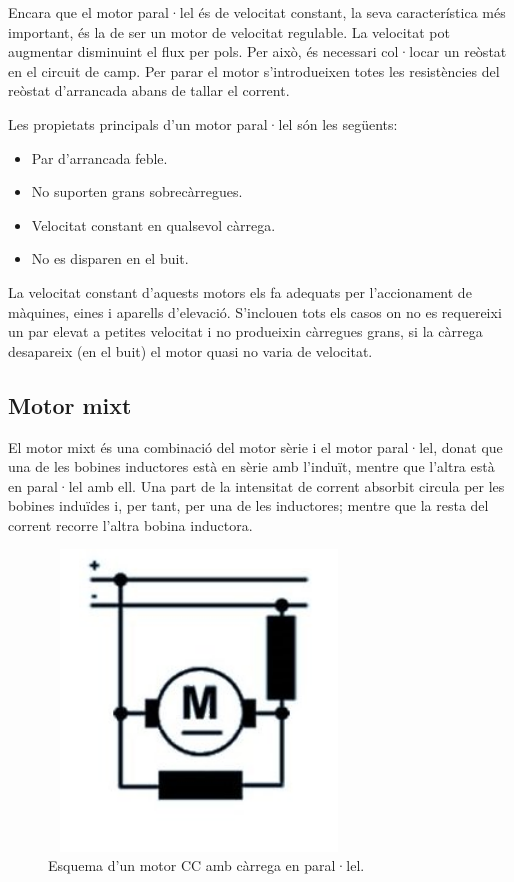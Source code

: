 Encara que el motor paral·lel és de velocitat constant, la seva característica més important, és la de ser un motor de velocitat regulable. La velocitat pot augmentar disminuint el flux per pols. Per això, és necessari col·locar un reòstat en el circuit de camp. Per parar el motor s'introdueixen totes les resistències del reòstat d'arrancada abans de tallar el corrent.

Les propietats principals d'un motor paral·lel són les següents:
\begin{itemize}
    \item Par d'arrancada feble.
    \item No suporten grans sobrecàrregues.
    \item Velocitat constant en qualsevol càrrega.
    \item No es disparen en el buit.
\end{itemize}

La velocitat constant d'aquests motors els fa adequats per l'accionament de màquines, eines i aparells d'elevació. S'inclouen tots els casos on no es requereixi un par elevat a petites velocitat i no produeixin càrregues grans, si la càrrega desapareix (en el buit) el motor quasi no varia de velocitat.

\subsection{Motor mixt}
El motor mixt és una combinació del motor sèrie i el motor paral·lel,  donat que una de les bobines inductores està en sèrie amb l'induït, mentre que l'altra està en paral·lel amb ell. Una part de la intensitat de corrent absorbit circula per les bobines induïdes i, per tant, per una de les inductores; mentre que la resta del corrent recorre l'altra bobina inductora. 

\begin{figure}[H]
		\centering
    	\includegraphics[width=8cm, height=8cm]{Motors/Motor_compuesto.jpg}
     	\caption{Esquema d'un motor CC amb càrrega en paral·lel.} 
\end{figure}

